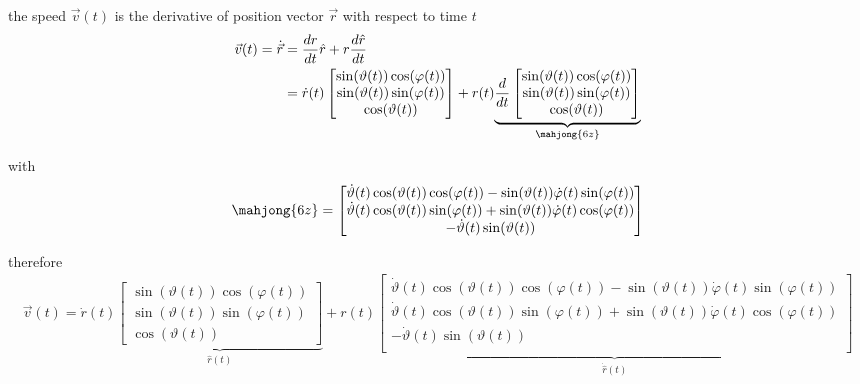 \documentclass[11pt,a4paper]{article}
\begin{document}
\begin{enumerate}
the speed $\vec{v}(t)$ is the derivative of position vector $\vec{r}$ with respect to time $t$
\begin{align*}
\vec{v}(t)=\dot{\vec{r}}
&=\frac{dr}{dt}\hat{r}+r\frac{d\hat{r}}{dt} \\
&=
\dot{r}(t)
\begin{bmatrix}
\sin(\vartheta(t))\cos(\varphi(t)) \\
\sin(\vartheta(t))\sin(\varphi(t)) \\
\cos(\vartheta(t))
\end{bmatrix}
+
r(t)
\underset{\mahjong{6z}}{\underbrace{
\frac{d}{dt}
\begin{bmatrix}
\sin(\vartheta(t))\cos(\varphi(t)) \\
\sin(\vartheta(t))\sin(\varphi(t)) \\
\cos(\vartheta(t))
\end{bmatrix}
}} \\
\end{align*}

with
\begin{align*}
\mahjong{6z}
&=
\begin{bmatrix}
\dot{\vartheta}(t)\cos(\vartheta(t))\cos(\varphi(t))-\sin(\vartheta(t))\dot{\varphi}(t)\sin(\varphi(t)) \\
\dot{\vartheta}(t)\cos(\vartheta(t))\sin(\varphi(t))+\sin(\vartheta(t))\dot{\varphi}(t)\cos(\varphi(t)) \\
-\dot{\vartheta}(t)\sin(\vartheta(t)) \\
\end{bmatrix} \\
\end{align*}

therefore
\begin{align}
\vec{v}(t)=
\dot{r}(t)
\underset{\hat{r}(t)}{\underbrace{
\begin{bmatrix}
\sin(\vartheta(t))\cos(\varphi(t)) \\
\sin(\vartheta(t))\sin(\varphi(t)) \\
\cos(\vartheta(t))
\end{bmatrix}
}}
+
r(t)
\underset{\dot{\hat{r}}(t)}{\underbrace{
\begin{bmatrix}
\dot{\vartheta}(t)\cos(\vartheta(t))\cos(\varphi(t))-\sin(\vartheta(t))\dot{\varphi}(t)\sin(\varphi(t)) \\
\dot{\vartheta}(t)\cos(\vartheta(t))\sin(\varphi(t))+\sin(\vartheta(t))\dot{\varphi}(t)\cos(\varphi(t)) \\
-\dot{\vartheta}(t)\sin(\vartheta(t)) \\
\end{bmatrix}
}}
\end{align}


\end{enumerate}
\end{document}

